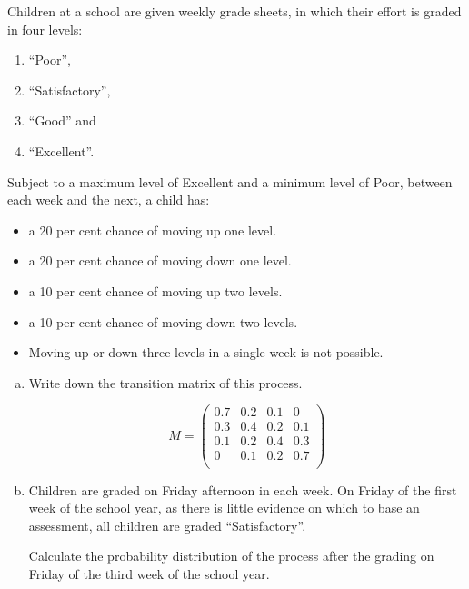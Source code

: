 \documentclass[a4paper,12pt]{article}
\begin{document}
	
	
	\large
	\noindent Children at a school are given weekly grade sheets, in which their effort is graded in four levels: 
	\begin{framed}
		\begin{multicols}{2}
			\begin{enumerate}
				\item  “Poor”, 
				\item  “Satisfactory”, 
				\item  “Good” and 
				\item  “Excellent”.
			\end{enumerate}
		\end{multicols}
	\end{framed}
	
	\noindent Subject to a
	maximum level of Excellent and a minimum level of Poor, between each week and the next, a child has:
	\begin{itemize}
		\item a 20 per cent chance of moving up one level.
		\item a 20 per cent chance of moving down one level.
		\item a 10 per cent chance of moving up two levels.
		\item a 10 per cent chance of moving down two levels.
		\item Moving up or down three levels in a single week is not possible.
	\end{itemize}
	
	\begin{enumerate}[(a)]
		\item 
		Write down the transition matrix of this process. \bigskip
		
		\newpage
		
		\[M = \begin{pmatrix}
		0.7	&	0.2	&	0.1 & 0 \\
		0.3	&	0.4	&	0.2 & 0.1 \\
		0.1	&	0.2	&	0.4 & 0.3 \\
		0	&	0.1	&	0.2 & 0.7 \\
		\end{pmatrix}\]
		
		\newpage
		
		
		
		\item Children are graded on Friday afternoon in each week. On Friday of the first week of the school year, as there is little evidence on which to base an assessment, all children
		are graded “Satisfactory”.
		
		Calculate the probability distribution of the process after the grading on Friday of the third week of the school year.
		
	\end{enumerate}
	\newpage
	
\end{document}
